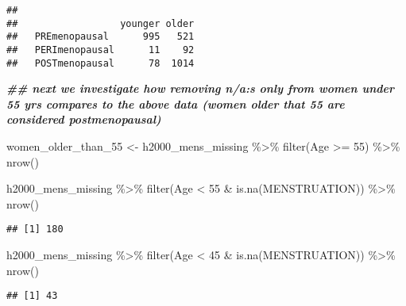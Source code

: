 \documentclass[
]{article}
\newenvironment{Shaded}{\begin{snugshade}}{\end{snugshade}}
\newcommand{\DecValTok}[1]{\textcolor[rgb]{0.00,0.00,0.81}{#1}}
\newcommand{\DocumentationTok}[1]{\textcolor[rgb]{0.56,0.35,0.01}{\textbf{\textit{#1}}}}
\newcommand{\FunctionTok}[1]{\textcolor[rgb]{0.00,0.00,0.00}{#1}}
\newcommand{\NormalTok}[1]{#1}
\newcommand{\OtherTok}[1]{\textcolor[rgb]{0.56,0.35,0.01}{#1}}
\newcommand{\SpecialCharTok}[1]{\textcolor[rgb]{0.00,0.00,0.00}{#1}}
\begin{document}
\begin{verbatim}
##                 
##                  younger older
##   PREmenopausal      995   521
##   PERImenopausal      11    92
##   POSTmenopausal      78  1014
\end{verbatim}

\begin{Shaded}
\begin{Highlighting}[]
\DocumentationTok{\#\# next we investigate how removing n/a:s only from women under 55 yrs compares to the above data (women older that 55 are considered postmenopausal)}

\NormalTok{women\_older\_than\_55 }\OtherTok{\textless{}{-}}\NormalTok{ h2000\_mens\_missing }\SpecialCharTok{\%\textgreater{}\%} 
  \FunctionTok{filter}\NormalTok{(Age }\SpecialCharTok{\textgreater{}=} \DecValTok{55}\NormalTok{) }\SpecialCharTok{\%\textgreater{}\%} \FunctionTok{nrow}\NormalTok{() }

\NormalTok{h2000\_mens\_missing }\SpecialCharTok{\%\textgreater{}\%} 
  \FunctionTok{filter}\NormalTok{(Age }\SpecialCharTok{\textless{}} \DecValTok{55} \SpecialCharTok{\&} \FunctionTok{is.na}\NormalTok{(MENSTRUATION)) }\SpecialCharTok{\%\textgreater{}\%} 
  \FunctionTok{nrow}\NormalTok{() }
\end{Highlighting}
\end{Shaded}

\begin{verbatim}
## [1] 180
\end{verbatim}

\begin{Shaded}
\begin{Highlighting}[]
\NormalTok{h2000\_mens\_missing }\SpecialCharTok{\%\textgreater{}\%} 
  \FunctionTok{filter}\NormalTok{(Age }\SpecialCharTok{\textless{}} \DecValTok{45} \SpecialCharTok{\&} \FunctionTok{is.na}\NormalTok{(MENSTRUATION)) }\SpecialCharTok{\%\textgreater{}\%} 
  \FunctionTok{nrow}\NormalTok{() }
\end{Highlighting}
\end{Shaded}

\begin{verbatim}
## [1] 43
\end{verbatim}
\end{document}
